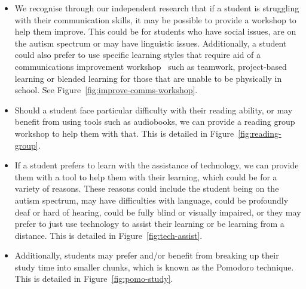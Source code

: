 \begin{itemize}
    \item We recognise through our independent research that if a student is struggling with their communication skills, it may be possible to provide a workshop to help them improve. This could be for students who have social issues, are on the autism spectrum or may have linguistic issues. Additionally, a student could also prefer to use specific learning styles that require aid of a communications improvement workshop \textemdash~such as teamwork, project-based learning or blended learning for those that are unable to be physically in school. See Figure~\ref{fig:improve-comms-workshop}.
    \item Should a student face particular difficulty with their reading ability, or may benefit from using tools such as audiobooks, we can provide a reading group workshop to help them with that. This is detailed in Figure~\ref{fig:reading-group}.
    \item If a student prefers to learn with the assistance of technology, we can provide them with a tool to help them with their learning, which could be for a variety of reasons. These reasons could include the student being on the autism spectrum, may have difficulties with language, could be profoundly deaf or hard of hearing, could be fully blind or visually impaired, or they may prefer to just use technology to assist their learning or be learning from a distance. This is detailed in Figure~\ref{fig:tech-assist}.
    \item Additionally, students may prefer and/or benefit from breaking up their study time into smaller chunks, which is known as the Pomodoro technique. This is detailed in Figure~\ref{fig:pomo-study}.
\end{itemize}